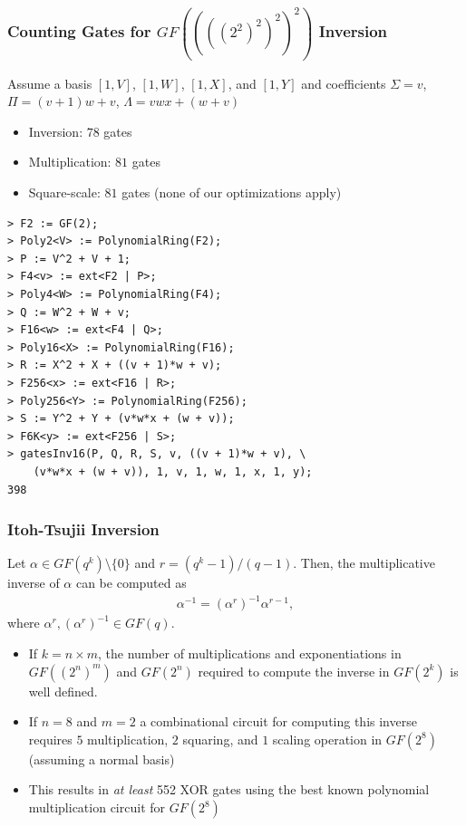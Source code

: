 \documentclass[10pt]{beamer}
\begin{document}
\begin{frame}[fragile]
	\frametitle{Counting Gates for $GF((((2^2)^2)^2)^2)$ Inversion}
	Assume a basis $[1, V]$, $[1, W]$, $[1, X]$, and $[1, Y]$ and coefficients $\Sigma = v$, $\Pi = (v + 1)w + v$, $\Lambda = vwx + (w + v)$
\begin{itemize}
	\item Inversion: $78$ gates
	\item Multiplication: $81$ gates
	\item Square-scale: $81$ gates (none of our optimizations apply)
\end{itemize}

\begin{verbatim}
> F2 := GF(2);
> Poly2<V> := PolynomialRing(F2);
> P := V^2 + V + 1;
> F4<v> := ext<F2 | P>;
> Poly4<W> := PolynomialRing(F4);
> Q := W^2 + W + v;
> F16<w> := ext<F4 | Q>;
> Poly16<X> := PolynomialRing(F16);
> R := X^2 + X + ((v + 1)*w + v);
> F256<x> := ext<F16 | R>;
> Poly256<Y> := PolynomialRing(F256);
> S := Y^2 + Y + (v*w*x + (w + v));
> F6K<y> := ext<F256 | S>;
> gatesInv16(P, Q, R, S, v, ((v + 1)*w + v), \
	(v*w*x + (w + v)), 1, v, 1, w, 1, x, 1, y);
398
\end{verbatim}

\end{frame}

\begin{frame}
	\frametitle{Itoh-Tsujii Inversion}
\begin{theorem}
Let $\alpha \in GF(q^k) \setminus \{0\}$ and $r = (q^k - 1)/(q - 1)$. Then, the multiplicative inverse of $\alpha$ can be computed as
\begin{align*}
\alpha^{-1} = (\alpha^r)^{-1}\alpha^{r-1},
\end{align*}
where $\alpha^r, (\alpha^r)^{-1} \in GF(q)$.
\end{theorem}

\begin{itemize}
	\pause
	\item If $k = n \times m$, the number of multiplications and exponentiations in $GF((2^n)^m)$ and $GF(2^n)$ required to compute the inverse in $GF(2^k)$ is well defined.
	\pause
	\item If $n = 8$ and $m = 2$ a combinational circuit for computing this inverse requires $5$ multiplication, $2$ squaring, and $1$ scaling operation in $GF(2^8)$ (assuming a normal basis)
	\pause
	\item This results in \emph{at least} 552 XOR gates using the best known polynomial multiplication circuit for $GF(2^8)$
\end{itemize}

\end{frame}
\end{document}
